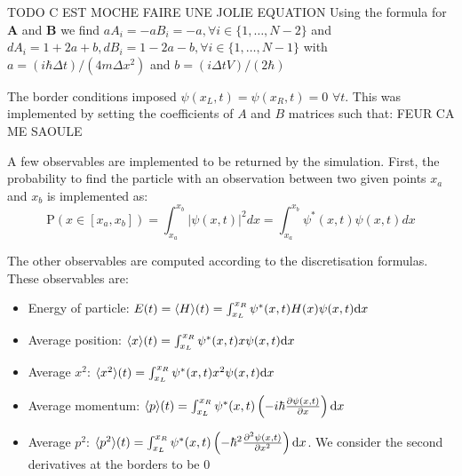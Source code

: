 TODO C EST MOCHE FAIRE UNE JOLIE EQUATION
Using the formula for $\mathbf{A}$ and $\mathbf{B}$ we find $aA_i = -aB_i = -a , \forall i \in\{1, \dots, N-2\}$ and $dA_i = 1 + 2a + b, dB_i = 1 - 2a - b , \forall i \in\{1, \dots, N-1\}$ with $a = (i\hbar \Delta t)/(4m \Delta x^2)$ and $b = (i\Delta t V)/(2\hbar)$

The border conditions imposed \(\psi(x_L, t) = \psi(x_R, t) = 0\,\, \forall t\). This was implemented by setting the coefficients of \(A\) and \(B\) matrices such that: FEUR CA ME SAOULE

A few observables are implemented to be returned by the simulation. First, the probability to find the particle with an observation between two given points $x_a$ and $x_b$ is implemented as:
\begin{equation}
    \mathrm{P}(x\in[x_a,x_b]) = \int_{x_a}^{x_b}|\psi(x,t)|^2 dx = \int_{x_a}^{x_b}\psi^*(x,t)\psi(x,t) dx
\end{equation}

The other observables are computed according to the discretisation formulas. These observables are:
\begin{itemize}
    \item Energy of particle: \(E(t) = \langle H \rangle(t) = \int_{x_L}^{x_R} \psi^*(x,t) H(x) \psi(x,t) \mathrm{d} x\)
    \item Average position: \(\langle x \rangle(t) = \int_{x_L}^{x_R} \psi^*(x,t) x \psi(x,t) \mathrm{d} x\)
    \item Average \(x^2\): \(\langle x^2 \rangle(t) = \int_{x_L}^{x_R} \psi^*(x,t) x^2 \psi(x,t) \mathrm{d} x\)
    \item Average momentum: \(\langle p \rangle(t) = \int_{x_L}^{x_R} \psi^*(x,t) \left( -i \hbar \frac{\partial \psi(x,t)}{\partial x} \right) \mathrm{d} x\)
    \item Average \(p^2\): \(\langle p^2 \rangle(t) = \int_{x_L}^{x_R} \psi^*(x,t) \left( - \hbar^2 \frac{\partial^2 \psi(x,t)}{\partial x^2} \right) \mathrm{d} x\). We consider the second derivatives at the borders to be \(0\)
\end{itemize}
